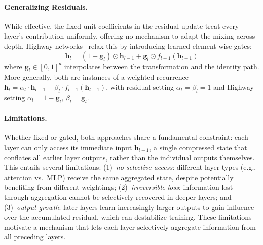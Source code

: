 \paragraph{Generalizing Residuals.}
While effective, the fixed unit coefficients in the residual update treat every layer's contribution uniformly, offering no mechanism to adapt the mixing across depth.
Highway networks~\citep{srivastava2015highway} relax this by introducing learned element-wise gates:
$$\bm{h}_{l} = (1 - \bm{g}_{l}) \odot \bm{h}_{l-1} + \bm{g}_{l} \odot f_{l-1}(\bm{h}_{l-1})$$
where $\bm{g}_l \in [0,1]^d$ interpolates between the transformation and the identity path.
More generally, both are instances of a weighted recurrence $\bm{h}_{l} = \alpha_{l} \cdot \bm{h}_{l-1} + \beta_{l} \cdot f_{l-1}(\bm{h}_{l-1})$, with residual setting $\alpha_{l} {=} \beta_{l} {=} 1$ and Highway setting $\alpha_{l} {=} 1 {-} \bm{g}_{l},\, \beta_{l} {=} \bm{g}_{l}$.

\paragraph{Limitations.}
Whether fixed or gated, both approaches share a fundamental constraint: each layer can only access its immediate input $\bm{h}_{l-1}$, a single compressed state that conflates all earlier layer outputs, rather than the individual outputs themselves.
This entails several limitations:
(1)~\emph{no selective access}: different layer types (e.g., attention vs.\ MLP) receive the same aggregated state, despite potentially benefiting from different weightings;
(2)~\emph{irreversible loss}: information lost through aggregation cannot be selectively recovered in deeper layers;
and (3)~\emph{output growth}: later layers learn increasingly larger outputs to gain influence over the accumulated residual, which can destabilize training.
These limitations motivate a mechanism that lets each layer selectively aggregate information from all preceding layers.









